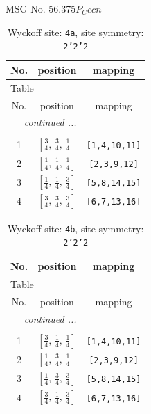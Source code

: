 \documentclass[fleqn,8pt]{jsarticle}
\begin{document}
\setcounter{MaxMatrixCols}{32}

\renewcommand{\tablename}{Table~}
\renewcommand{\figurename}{Figure~}
\begin{center}
\LARGE
MSG No. 56.375\quad$P_{C}ccn$
\end{center}
\renewcommand{\arraystretch}{1.2}
\begin{longtable}{ccc}
\caption{Wyckoff site: {\tt 4a}, site symmetry: {\tt 2'2'2}}
 \\
 \hline \hline
No. & position & mapping \\ \hline \endfirsthead

\multicolumn{2}{l}{\tablename\ \thetable{}} \\
 \hline \hline
No. & position & mapping \\ \hline \endhead

 \hline \hline
\multicolumn{2}{r}{\footnotesize\it continued ...} \\ \endfoot

 \hline \hline
\multicolumn{2}{r}{} \\ \endlastfoot

1 & $\left[ \frac{3}{4},\, \frac{3}{4},\, \frac{1}{4} \right]$ & {\tt [1,4,10,11]} \\ \hline
2 & $\left[ \frac{1}{4},\, \frac{1}{4},\, \frac{1}{4} \right]$ & {\tt [2,3,9,12]} \\ \hline
3 & $\left[ \frac{1}{4},\, \frac{1}{4},\, \frac{3}{4} \right]$ & {\tt [5,8,14,15]} \\ \hline
4 & $\left[ \frac{3}{4},\, \frac{3}{4},\, \frac{3}{4} \right]$ & {\tt [6,7,13,16]} \\
\end{longtable}
\renewcommand{\arraystretch}{1.2}
\begin{longtable}{ccc}
\caption{Wyckoff site: {\tt 4b}, site symmetry: {\tt 2'2'2}}
 \\
 \hline \hline
No. & position & mapping \\ \hline \endfirsthead

\multicolumn{2}{l}{\tablename\ \thetable{}} \\
 \hline \hline
No. & position & mapping \\ \hline \endhead

 \hline \hline
\multicolumn{2}{r}{\footnotesize\it continued ...} \\ \endfoot

 \hline \hline
\multicolumn{2}{r}{} \\ \endlastfoot

1 & $\left[ \frac{3}{4},\, \frac{1}{4},\, \frac{1}{4} \right]$ & {\tt [1,4,10,11]} \\ \hline
2 & $\left[ \frac{1}{4},\, \frac{3}{4},\, \frac{1}{4} \right]$ & {\tt [2,3,9,12]} \\ \hline
3 & $\left[ \frac{1}{4},\, \frac{3}{4},\, \frac{3}{4} \right]$ & {\tt [5,8,14,15]} \\ \hline
4 & $\left[ \frac{3}{4},\, \frac{1}{4},\, \frac{3}{4} \right]$ & {\tt [6,7,13,16]} \\
\end{longtable}
\end{document}
